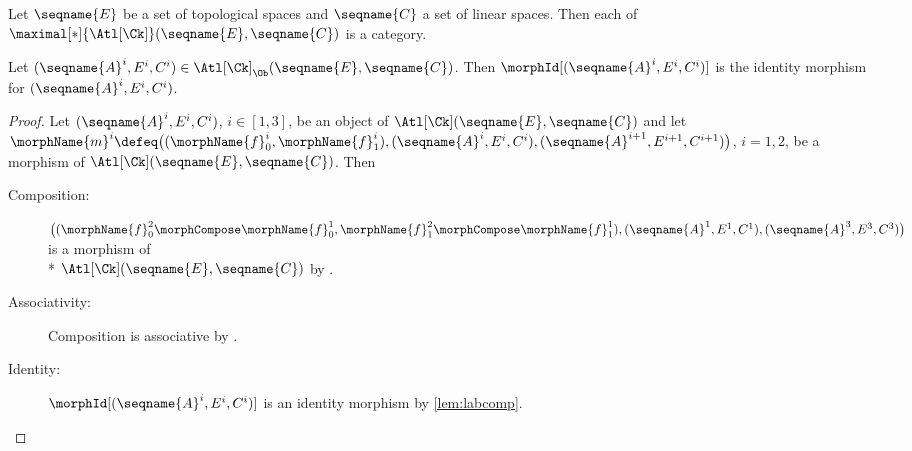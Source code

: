 \documentclass{article}
\begin{document}
\begin{lemma}
\label{lem:Ck-ATLiscat}
Let $\seqname{E}$ be a set of topological spaces and $\seqname{C}$ a set
of linear spaces. Then each of
$\maximal[*]{\Atl[\Ck]}(\seqname{E}, \seqname{C})$ is a category.

Let
$
  (\seqname{A}^i, E^i, C^i)
  \in
  \Atl[\Ck]_\Ob(\seqname{E}, \seqname{C})
$.
Then $\morphId[{{(\seqname{A}^i, E^i, C^i)}}]$ is the
identity morphism for $(\seqname{A}^i, E^i, C^i)$.

\begin{proof}
Let $(\seqname{A}^i,E^i,C^i)$, $i \in [1,3]$,
be an object of $\Atl[\Ck](\seqname{E}, \seqname{C})$ and
let
$
  \morphName{m}^i \defeq \\
  \bigl (
    (\morphName{f}_0^i,\morphName{f}_1^i),
    (\seqname{A}^i,E^i,C^i),
    (\seqname{A}^{i+1},E^{i+1},C^{i+1})
  \bigr )
$, $i=1,2$,
be a morphism of $\Atl[\Ck](\seqname{E}, \seqname{C})$. Then
\begin{description}
\item[Composition:]
$
  \bigl (
    (
      \morphName{f}_0^2 \morphCompose \morphName{f}_0^1,
      \morphName{f}_1^2 \morphCompose \morphName{f}_1^1
    ),
    (\seqname{A}^1,E^1,C^1),
    (\seqname{A}^3,E^3,C^3)
  \bigr )
$
is a morphism of \\*
$\Atl[\Ck](\seqname{E}, \seqname{C})$ by
.

\item[Associativity:]
Composition is associative by .

\item[Identity:]
$\morphId[{{(\seqname{A}^i, E^i, C^i)}}]$ is an identity
morphism by \cref{lem:labcomp}.
\end{description}
\end{proof}
\end{lemma}
\end{document}
